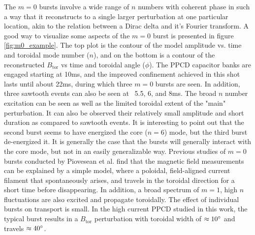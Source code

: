 \begin{refsection}
The $m = 0$ bursts involve a wide range of $n$ numbers with coherent phase in such a way that it reconstructs to a single larger perturbation at one particular location, akin to the relation between a Dirac delta and it's Fourier transform. A good way to visualize some aspects of the $m = 0$ burst is presented in figure \ref{fig:m0_example}. The top plot is the contour of the model amplitude vs. time and toroidal mode number ($n$), and on the bottom is a contour of the reconstructed $B_{\text{tor}}$ vs time and toroidal angle ($\phi$). The PPCD capacitor banks are engaged starting at 10ms, and the improved confinement achieved in this shot lasts until about 22ms, during which three $m = 0$ bursts are seen. In addition, three sawtooth events can also be seen at ~5.5, 6, and 8ms. The broad $n$ number excitation can be seen as well as the limited toroidal extent of the "main" perturbation. It can also be observed their relatively small amplitude and short duration as compared to sawtooth events. It is interesting to point out that the second burst seems to have energized the core ($n = 6$) mode, but the third burst de-energized it. It is generally the case that the bursts will generally interact with the core mode, but not in an easily generalizable way. Previous studies of $m = 0$ bursts conducted by Piovesean et al.\cite{Piovesan2008} find that the magnetic field measurements can be explained by a simple model, where a poloidal, field-aligned current filament that spontaneously arises, and travels in the toroidal direction for a short time before disappearing. In addition, a broad spectrum of $m = 1$, high $n$ fluctuations are also excited and propagate toroidally.  The effect of individual bursts on transport is small\cite{Piovesan2008}. In the high current PPCD studied in this work, the typical burst results in a $B_{\text{tor}}$ perturbation with toroidal width of $\approx 10\degree$ and travels $\approx 40\degree$. 


\end{refsection}
